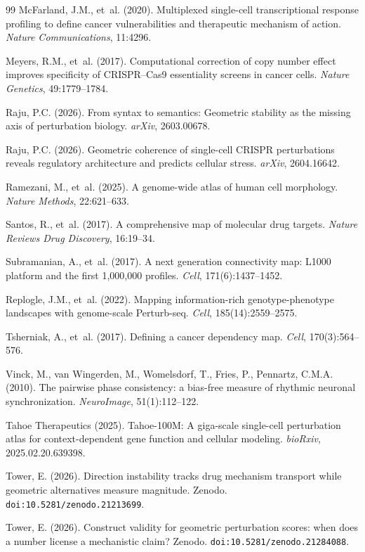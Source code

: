 \documentclass[11pt]{article}
\begin{document}
\begin{thebibliography}{99}
McFarland, J.M., et~al. (2020).
Multiplexed single-cell transcriptional response profiling to define cancer vulnerabilities and therapeutic mechanism of action.
\textit{Nature Communications}, 11:4296.

Meyers, R.M., et~al. (2017).
Computational correction of copy number effect improves specificity of CRISPR--Cas9 essentiality screens in cancer cells.
\textit{Nature Genetics}, 49:1779--1784.

Raju, P.C. (2026).
From syntax to semantics: Geometric stability as the missing axis of perturbation biology.
\textit{arXiv}, 2603.00678.

Raju, P.C. (2026).
Geometric coherence of single-cell CRISPR perturbations reveals regulatory architecture and predicts cellular stress.
\textit{arXiv}, 2604.16642.

Ramezani, M., et~al. (2025).
A genome-wide atlas of human cell morphology.
\textit{Nature Methods}, 22:621--633.

Santos, R., et~al. (2017).
A comprehensive map of molecular drug targets.
\textit{Nature Reviews Drug Discovery}, 16:19--34.

Subramanian, A., et~al. (2017).
A next generation connectivity map: L1000 platform and the first 1,000,000 profiles.
\textit{Cell}, 171(6):1437--1452.

Replogle, J.M., et~al. (2022).
Mapping information-rich genotype-phenotype landscapes with genome-scale Perturb-seq.
\textit{Cell}, 185(14):2559--2575.

Tsherniak, A., et~al. (2017).
Defining a cancer dependency map.
\textit{Cell}, 170(3):564--576.

Vinck, M., van Wingerden, M., Womelsdorf, T., Fries, P., Pennartz, C.M.A. (2010).
The pairwise phase consistency: a bias-free measure of rhythmic neuronal synchronization.
\textit{NeuroImage}, 51(1):112--122.

Tahoe Therapeutics (2025).
Tahoe-100M: A giga-scale single-cell perturbation atlas for context-dependent gene function and cellular modeling.
\textit{bioRxiv}, 2025.02.20.639398.

Tower, E. (2026).
Direction instability tracks drug mechanism transport while geometric alternatives measure magnitude.
Zenodo. \texttt{doi:10.5281/zenodo.21213699}.

Tower, E. (2026).
Construct validity for geometric perturbation scores: when does a number license a mechanistic claim?
Zenodo. \texttt{doi:10.5281/zenodo.21284088}.

\end{thebibliography}
\end{document}
